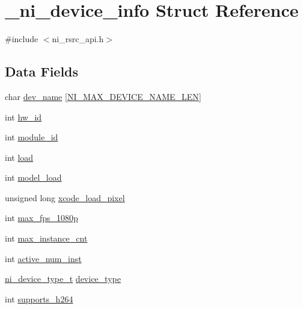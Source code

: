 \hypertarget{struct__ni__device__info}{}\section{\+\_\+ni\+\_\+device\+\_\+info Struct Reference}
\label{struct__ni__device__info}


{\ttfamily \#include $<$ni\+\_\+rsrc\+\_\+api.\+h$>$}

\subsection*{Data Fields}
\begin{DoxyCompactItemize}
\item 
char \mbox{\hyperlink{struct__ni__device__info_a5bddd902bffa71cca77922ac8e58f9dd}{dev\+\_\+name}} \mbox{[}\mbox{\hyperlink{ni__rsrc__api_8h_a38deaa045e5ce61a183c8ceddc618d7e}{N\+I\+\_\+\+M\+A\+X\+\_\+\+D\+E\+V\+I\+C\+E\+\_\+\+N\+A\+M\+E\+\_\+\+L\+EN}}\mbox{]}
\item 
int \mbox{\hyperlink{struct__ni__device__info_a0a8a4b1c98c0ad55e5854a002f18caba}{hw\+\_\+id}}
\item 
int \mbox{\hyperlink{struct__ni__device__info_a0bc5f91a15f045d84b9cc9c2cfe03ca0}{module\+\_\+id}}
\item 
int \mbox{\hyperlink{struct__ni__device__info_aa1843f81d109cc0b7f234d61b5662119}{load}}
\item 
int \mbox{\hyperlink{struct__ni__device__info_a538a6b74864f5bde38bf1ed9bca85577}{model\+\_\+load}}
\item 
unsigned long \mbox{\hyperlink{struct__ni__device__info_af7b563c1eb04ef61577e64a7319c1a77}{xcode\+\_\+load\+\_\+pixel}}
\item 
int \mbox{\hyperlink{struct__ni__device__info_ad00a3c768a8b7c786d01bbbe31e9d810}{max\+\_\+fps\+\_\+1080p}}
\item 
int \mbox{\hyperlink{struct__ni__device__info_a798ec1d68cf857ec8b87ce67aec7e068}{max\+\_\+instance\+\_\+cnt}}
\item 
int \mbox{\hyperlink{struct__ni__device__info_a1de23e60eea7b12c7ed6122588591368}{active\+\_\+num\+\_\+inst}}
\item 
\mbox{\hyperlink{ni__defs_8h_a758f24acb02b236820c7390eed53d1cc}{ni\+\_\+device\+\_\+type\+\_\+t}} \mbox{\hyperlink{struct__ni__device__info_a7c83c99b4f3f7039be4f7e92f610c179}{device\+\_\+type}}
\item 
int \mbox{\hyperlink{struct__ni__device__info_a5fcf69e9dab3dc8290c17468ace87df4}{supports\+\_\+h264}}

\end{DoxyCompactItemize}
